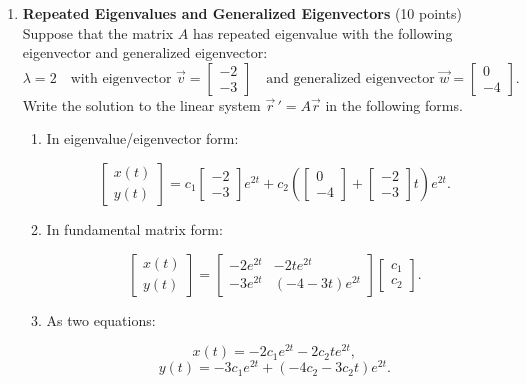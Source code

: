 \begin{enumerate}

  \newpage

  \item \textbf{Repeated Eigenvalues and Generalized Eigenvectors} (10 points)\\
  Suppose that the matrix $A$ has repeated eigenvalue with the following eigenvector and generalized eigenvector:  
  \[
  \lambda = 2 \quad \text{with eigenvector } \vec{v} = \left[\begin{array}{r}-2 \\ -3\end{array}\right]
  \quad \text{and generalized eigenvector } \vec{w} = \left[\begin{array}{r}0 \\ -4\end{array}\right].
  \]
  Write the solution to the linear system $\vec{r}\,' = A \vec{r}$ in the following forms.
  \begin{enumerate}[label=\textbf{\Alph*.}]
    \item In eigenvalue/eigenvector form:
    \begin{subanswer}
      \[
      \left[\begin{array}{l}x(t) \\ y(t)\end{array}\right]
      = c_{1}\left[\begin{array}{r}-2 \\ -3\end{array}\right] e^{2t}
      + c_{2}\left(\left[\begin{array}{r}0 \\ -4\end{array}\right] + \left[\begin{array}{r}-2 \\ -3\end{array}\right] t\right) e^{2t}.
      \]
    \end{subanswer}
    \item In fundamental matrix form:
    \begin{subanswer}
      \[
      \left[\begin{array}{l}x(t) \\ y(t)\end{array}\right]
      = \left[\begin{array}{rr}-2e^{2t} & -2t e^{2t} \\ -3e^{2t} & (-4 - 3t)e^{2t}\end{array}\right]
      \left[\begin{array}{l}c_{1} \\ c_{2}\end{array}\right].
      \]
    \end{subanswer}
    \item As two equations:
    \begin{subanswer}
      \[
      x(t) = -2c_{1}e^{2t} - 2c_{2}t e^{2t},
      \]
      \[
      y(t) = -3c_{1}e^{2t} + (-4c_{2} - 3c_{2}t)e^{2t}.
      \]
    \end{subanswer}
  \end{enumerate}


\end{enumerate}

